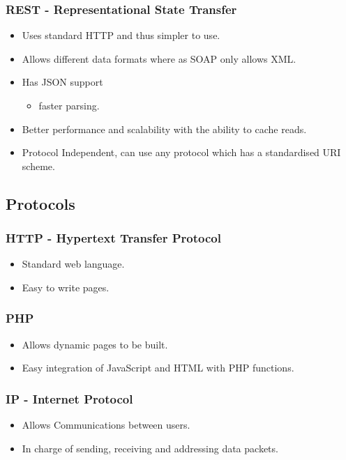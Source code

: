 \documentclass[12pt, oneside]{article}
\begin{document}
		\subsubsection{REST - Representational State Transfer}
		\begin{itemize}
			\item Uses standard HTTP and thus simpler to use.
		 	\item Allows different data formats where as SOAP only allows XML.
			\item Has JSON support
				\begin{itemize}
					\item faster parsing.				
				\end{itemize}			 
			\item Better performance and scalability with the ability to cache reads.
			\item Protocol Independent, can use any protocol which has a standardised URI scheme.		
		\end{itemize}
	\subsection{Protocols}
		\subsubsection{HTTP - Hypertext Transfer Protocol}
			\begin{itemize}
				\item Standard web language.
				\item Easy to write pages.
			\end{itemize}
		\subsubsection{PHP}
			\begin{itemize}
				\item Allows dynamic pages to be built.
				\item Easy integration of JavaScript and HTML with PHP functions.
			\end{itemize}
		\subsubsection{IP - Internet Protocol}	
			\begin{itemize}
				\item Allows Communications between users.
				\item In charge of sending, receiving and addressing data packets.
			\end{itemize}				
\end{document}
